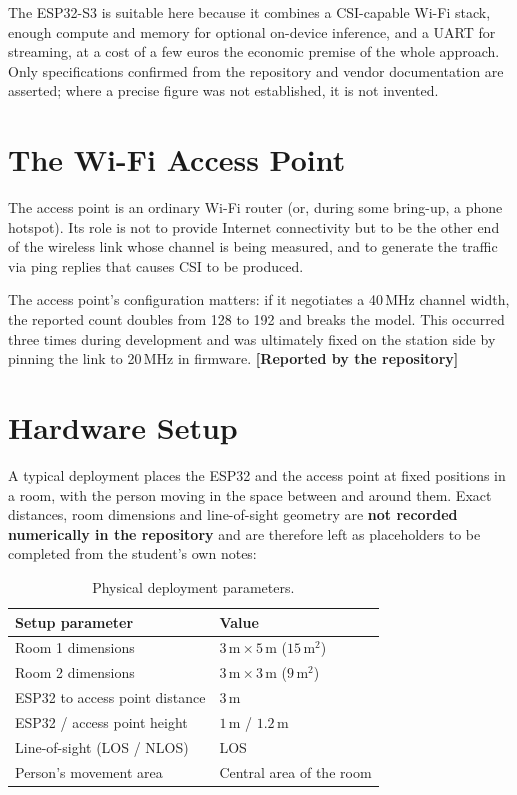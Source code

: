\documentclass[11pt,a4paper,oneside]{report}
\newcommand{\evidencetag}[2]{{\small\sffamily\bfseries\textcolor{#1}{[#2]}}}
\newcommand{\Repo}{\evidencetag{neutralgrey}{Reported by the repository}}
\begin{document}
The ESP32-S3 is suitable here because it combines a CSI-capable Wi-Fi stack,
enough compute and memory for optional on-device inference, and a UART for
streaming, at a cost of a few euros  the economic premise of the whole
approach. Only specifications confirmed from the repository and vendor
documentation are asserted; where a precise figure was not established, it is
not invented.

\section{The Wi-Fi Access Point}

The access point is an ordinary Wi-Fi router (or, during some bring-up, a phone
hotspot). Its role is not to provide Internet connectivity but to be the other
end of the wireless link whose channel is being measured, and to generate the
traffic via ping replies that causes CSI to be produced.

The access point's configuration matters: if it negotiates a 40\,MHz channel
width, the reported count doubles from 128 to 192 and breaks the model. This
occurred three times during development and was ultimately fixed on the station
side by pinning the link to 20\,MHz in firmware. \Repo

\section{Hardware Setup}

A typical deployment places the ESP32 and the access point at fixed positions
in a room, with the person moving in the space between and around them. Exact
distances, room dimensions and line-of-sight geometry are \textbf{not recorded
numerically in the repository} and are therefore left as placeholders to be
completed from the student's own notes:

\begin{table}[H]
\centering
\caption{Physical deployment parameters.}
\label{tab:deployment_parameters}
\begin{tabularx}{0.8\linewidth}{@{}Xl@{}}
\toprule
\textbf{Setup parameter} & \textbf{Value} \\
\midrule
Room 1 dimensions              & $3\,\mathrm{m} \times 5\,\mathrm{m}$ ($15\,\mathrm{m^2}$) \\
Room 2 dimensions              & $3\,\mathrm{m} \times 3\,\mathrm{m}$ ($9\,\mathrm{m^2}$) \\
ESP32 to access point distance & $3\,\mathrm{m}$ \\
ESP32 / access point height    & $1\,\mathrm{m}$ / $1.2\,\mathrm{m}$ \\
Line-of-sight (LOS / NLOS)     & LOS \\
Person's movement area         & Central area of the room \\
\bottomrule
\end{tabularx}
\end{table}
\end{document}
